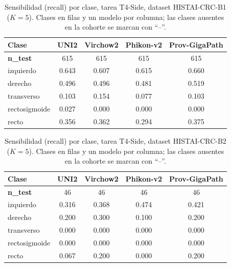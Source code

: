 \begin{table}[H]
\centering
\caption{Sensibilidad (recall) por clase, tarea T4-Side, dataset HISTAI-CRC-B1 ($K=5$). Clases en filas y un modelo por columna; las clases ausentes en la cohorte se marcan con ``--''.}
\label{tab:anexo_side_sensibilidad}
\begin{tabular}{l c c c c}
\toprule
\textbf{Clase} & \textbf{UNI2} & \textbf{Virchow2} & \textbf{Phikon-v2} & \textbf{Prov-GigaPath} \\
\midrule
\textbf{n\_test} & 615 & 615 & 615 & 615 \\
izquierdo & 0.643 & 0.607 & 0.615 & 0.660 \\
derecho & 0.496 & 0.496 & 0.481 & 0.519 \\
transverso & 0.103 & 0.154 & 0.077 & 0.103 \\
rectosigmoide & 0.027 & 0.000 & 0.000 & 0.000 \\
recto & 0.356 & 0.362 & 0.294 & 0.375 \\
\bottomrule
\end{tabular}
\end{table}

\begin{table}[H]
\centering
\caption{Sensibilidad (recall) por clase, tarea T4-Side, dataset HISTAI-CRC-B2 ($K=5$). Clases en filas y un modelo por columna; las clases ausentes en la cohorte se marcan con ``--''.}
\label{tab:anexo_side_sensibilidad_b2}
\begin{tabular}{l c c c c}
\toprule
\textbf{Clase} & \textbf{UNI2} & \textbf{Virchow2} & \textbf{Phikon-v2} & \textbf{Prov-GigaPath} \\
\midrule
\textbf{n\_test} & 46 & 46 & 46 & 46 \\
izquierdo & 0.316 & 0.368 & 0.474 & 0.421 \\
derecho & 0.200 & 0.300 & 0.100 & 0.200 \\
transverso & 0.000 & 0.000 & 0.000 & 0.000 \\
rectosigmoide & 0.000 & 0.000 & 0.000 & 0.000 \\
recto & 0.067 & 0.200 & 0.000 & 0.200 \\
\bottomrule
\end{tabular}
\end{table}

